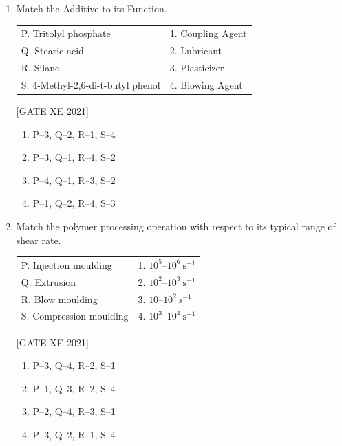 \documentclass[journal,12pt,onecolumn]{IEEEtran}
\theoremstyle{remark}
\begin{document}
\begin{enumerate}[resume]
\item Match the Additive to its Function.  

\begin{center}
\begin{tabular}{p{6cm} p{6cm}}
P. Tritolyl phosphate & 1. Coupling Agent \\
Q. Stearic acid       & 2. Lubricant \\
R. Silane             & 3. Plasticizer \\
S. 4-Methyl-2,6-di-t-butyl phenol & 4. Blowing Agent \\
\end{tabular}
\end{center}

\hfill[GATE XE 2021]

\begin{multicols}{2}
\begin{enumerate}
\item P–3, Q–2, R–1, S–4
\item P–3, Q–1, R–4, S–2
\item P–4, Q–1, R–3, S–2
\item P–1, Q–2, R–4, S–3
\end{enumerate}
\end{multicols}


\item Match the polymer processing operation with respect to its typical range of shear rate.  

\begin{center}
\begin{tabular}{p{6cm} p{6cm}}
P. Injection moulding & 1. $10^5$–$10^6\ \text{s}^{-1}$ \\
Q. Extrusion          & 2. $10^2$–$10^3\ \text{s}^{-1}$ \\
R. Blow moulding      & 3. $10$–$10^2\ \text{s}^{-1}$ \\
S. Compression moulding & 4. $10^3$–$10^4\ \text{s}^{-1}$ \\
\end{tabular}
\end{center}

\hfill[GATE XE 2021]

\begin{multicols}{2}
\begin{enumerate}
\item P–3, Q–4, R–2, S–1
\item P–1, Q–3, R–2, S–4
\item P–2, Q–4, R–3, S–1
\item P–3, Q–2, R–1, S–4
\end{enumerate}
\end{multicols}



\end{enumerate}
\end{document}
